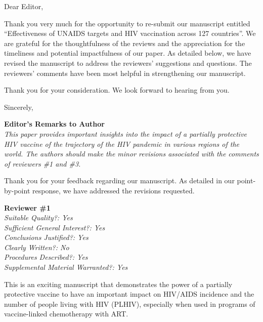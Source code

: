 \documentclass[12pt]{jpmletter}
\newcommand{\section}[1]{\textbf{#1}\\}
\newenvironment{original}{\it}{}
\begin{document}
  \begin{letter}{}

    \opening{Dear Editor,}
 
    Thank you very much for the opportunity to re-submit our
    manuscript entitled ``Effectiveness of UNAIDS targets and HIV
    vaccination across 127 countries''. We are grateful for the
    thoughtfulness of the reviews and the appreciation for the
    timeliness and potential impactfulness of our paper. As detailed
    below, we have revised the manuscript to address the reviewers’
    suggestions and questions. The reviewers’ comments have been most
    helpful in strengthening our manuscript.
 
    Thank you for your consideration. We look forward to hearing from
    you.

    \closing{Sincerely,}

    \newpage

    \section{Editor's Remarks to Author}
    \begin{original}
      This paper provides important insights into the impact of
      a partially protective HIV vaccine of the trajectory of the HIV
      pandemic in various regions of the world. The authors should
      make the minor revisions associated with the comments of
      reviewers \#1 and \#3.
    \end{original}
    
    Thank you for your feedback regarding our manuscript. As detailed
    in our point-by-point response, we have addressed the revisions
    requested.

    \section{Reviewer \#1}
    \begin{original}
      Suitable Quality?: Yes\\
      Sufficient General Interest?: Yes\\
      Conclusions Justified?: Yes\\
      Clearly Written?: No\\
      Procedures Described?: Yes\\
      Supplemental Material Warranted?: Yes

      This is an exciting manuscript that demonstrates the power of a
      partially protective vaccine to have an important impact on
      HIV/AIDS incidence and the number of people living with HIV
      (PLHIV), especially when used in programs of vaccine-linked
      chemotherapy with ART.
    \end{original}
    

\end{letter}
\end{document}

